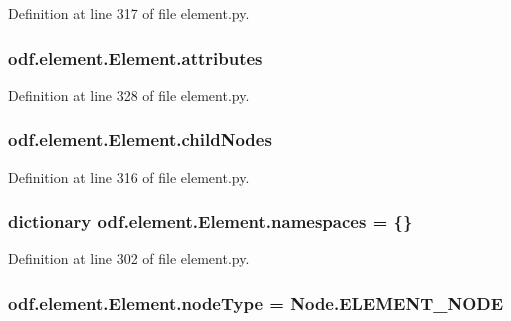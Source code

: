 Definition at line 317 of file element.\+py.

\hypertarget{classodf_1_1element_1_1Element_a075965834885860b3800d7a934d678c5}{
\subsubsection[{attributes}]{\setlength{\rightskip}{0pt plus 5cm}odf.\+element.\+Element.\+attributes}}\label{classodf_1_1element_1_1Element_a075965834885860b3800d7a934d678c5}


Definition at line 328 of file element.\+py.

\hypertarget{classodf_1_1element_1_1Element_a7b1caf94c20e484ead54b595dcce9064}{
\subsubsection[{child\+Nodes}]{\setlength{\rightskip}{0pt plus 5cm}odf.\+element.\+Element.\+child\+Nodes}}\label{classodf_1_1element_1_1Element_a7b1caf94c20e484ead54b595dcce9064}


Definition at line 316 of file element.\+py.

\hypertarget{classodf_1_1element_1_1Element_a6f97b7e2b9e13ea5e18d1856c10167e6}{
\subsubsection[{namespaces}]{\setlength{\rightskip}{0pt plus 5cm}dictionary odf.\+element.\+Element.\+namespaces = \{\}\hspace{0.3cm}{\ttfamily [static]}}}\label{classodf_1_1element_1_1Element_a6f97b7e2b9e13ea5e18d1856c10167e6}


Definition at line 302 of file element.\+py.

\hypertarget{classodf_1_1element_1_1Element_a0905e184b9692b74b085ebabe37debb5}{
\subsubsection[{node\+Type}]{\setlength{\rightskip}{0pt plus 5cm}odf.\+element.\+Element.\+node\+Type = Node.\+E\+L\+E\+M\+E\+N\+T\+\_\+\+N\+O\+D\+E\hspace{0.3cm}{\ttfamily [static]}}}\label{classodf_1_1element_1_1Element_a0905e184b9692b74b085ebabe37debb5}


